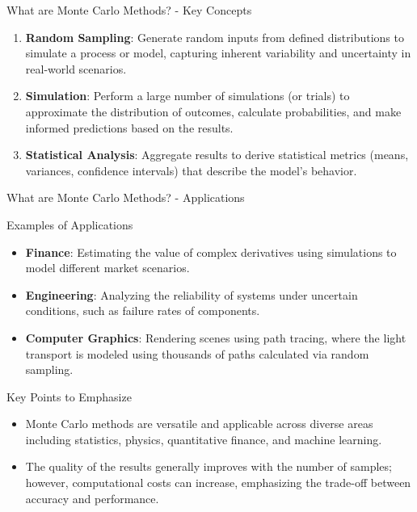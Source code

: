 \documentclass[aspectratio=169]{beamer}
\begin{document}
\begin{frame}[fragile]{What are Monte Carlo Methods? - Key Concepts}
    \begin{enumerate}
        \item \textbf{Random Sampling}: Generate random inputs from defined distributions to simulate a process or model, capturing inherent variability and uncertainty in real-world scenarios.
        
        \item \textbf{Simulation}: Perform a large number of simulations (or trials) to approximate the distribution of outcomes, calculate probabilities, and make informed predictions based on the results.

        \item \textbf{Statistical Analysis}: Aggregate results to derive statistical metrics (means, variances, confidence intervals) that describe the model's behavior.
    \end{enumerate}
\end{frame}

\begin{frame}[fragile]{What are Monte Carlo Methods? - Applications}
    \begin{block}{Examples of Applications}
        \begin{itemize}
            \item \textbf{Finance}: Estimating the value of complex derivatives using simulations to model different market scenarios.
            \item \textbf{Engineering}: Analyzing the reliability of systems under uncertain conditions, such as failure rates of components.
            \item \textbf{Computer Graphics}: Rendering scenes using path tracing, where the light transport is modeled using thousands of paths calculated via random sampling.
        \end{itemize}
    \end{block}

    \begin{block}{Key Points to Emphasize}
        \begin{itemize}
            \item Monte Carlo methods are versatile and applicable across diverse areas including statistics, physics, quantitative finance, and machine learning.
            \item The quality of the results generally improves with the number of samples; however, computational costs can increase, emphasizing the trade-off between accuracy and performance.
        \end{itemize}
    \end{block}
\end{frame}
\end{document}
